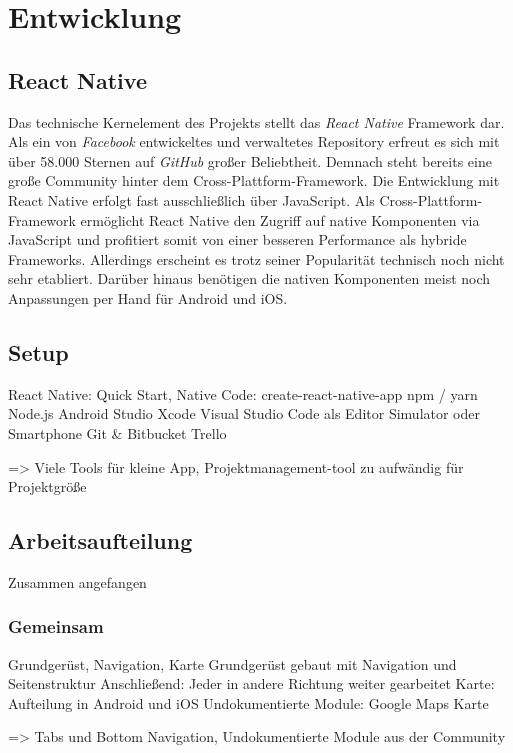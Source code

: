 \chapter{Entwicklung}
\label{entwicklung}


\section{React Native}
Das technische Kernelement des Projekts stellt das \emph{React Native} Framework dar.
Als ein von \emph{Facebook} entwickeltes und verwaltetes Repository erfreut es sich mit über 58.000 Sternen auf \emph{GitHub} großer Beliebtheit.
Demnach steht bereits eine große Community hinter dem Cross-Plattform-Framework.
Die Entwicklung mit React Native erfolgt fast ausschließlich über JavaScript.
Als Cross-Plattform-Framework ermöglicht React Native den Zugriff auf native Komponenten via JavaScript und profitiert somit von einer besseren Performance als hybride Frameworks.
Allerdings erscheint es trotz seiner Popularität technisch noch nicht sehr etabliert.
Darüber hinaus benötigen die nativen Komponenten meist noch Anpassungen per Hand für Android und iOS.


\section{Setup}
React Native: Quick Start, Native Code: create-react-native-app
npm / yarn
Node.js
Android Studio
Xcode
Visual Studio Code als Editor
Simulator oder Smartphone
Git \& Bitbucket
Trello

=> Viele Tools für kleine App, Projektmanagement-tool zu aufwändig für Projektgröße



\section{Arbeitsaufteilung}
Zusammen angefangen

\subsection{Gemeinsam}
Grundgerüst, Navigation, Karte
Grundgerüst gebaut mit Navigation und Seitenstruktur
Anschließend: Jeder in andere Richtung weiter gearbeitet
Karte: Aufteilung in Android und iOS
Undokumentierte Module: Google Maps Karte

=> Tabs und Bottom Navigation, Undokumentierte Module aus der Community


